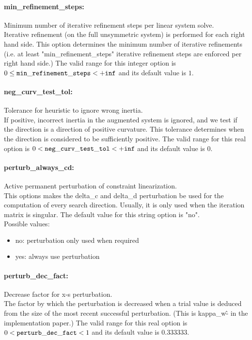 \paragraph{min\_refinement\_steps:}\label{sec:min_refinement_steps} Minimum number of iterative refinement steps per linear system solve. $\;$ \\
 Iterative refinement (on the full unsymmetric
system) is performed for each right hand side. 
This option determines the minimum number of
iterative refinements (i.e. at least
"min\_refinement\_steps" iterative refinement
steps are enforced per right hand side.) The valid range for this integer option is
$0 \le {\tt min\_refinement\_steps } <  {\tt +inf}$
and its default value is $1$.


\paragraph{neg\_curv\_test\_tol:}\label{sec:neg_curv_test_tol} Tolerance for heuristic to ignore wrong inertia. $\;$ \\
 If positive, incorrect inertia in the augmented
system is ignored, and we test if the direction
is a direction of positive curvature.  This
tolerance determines when the direction is
considered to be sufficiently positive. The valid range for this real option is 
$0 <  {\tt neg\_curv\_test\_tol } <  {\tt +inf}$
and its default value is $0$.


\paragraph{perturb\_always\_cd:}\label{sec:perturb_always_cd} Active permanent perturbation of constraint linearization. $\;$ \\
 This options makes the delta\_c and delta\_d
perturbation be used for the computation of every
search direction.  Usually, it is only used when
the iteration matrix is singular.
The default value for this string option is "no".
\\ 
Possible values:
\begin{itemize}
   \item no: perturbation only used when required
   \item yes: always use perturbation
\end{itemize}

\paragraph{perturb\_dec\_fact:}\label{sec:perturb_dec_fact} Decrease factor for x-s perturbation. $\;$ \\
 The factor by which the perturbation is decreased
when a trial value is deduced from the size of
the most recent successful perturbation. (This is
kappa\_w\^- in the implementation paper.) The valid range for this real option is 
$0 <  {\tt perturb\_dec\_fact } <  1$
and its default value is $0.333333$.


